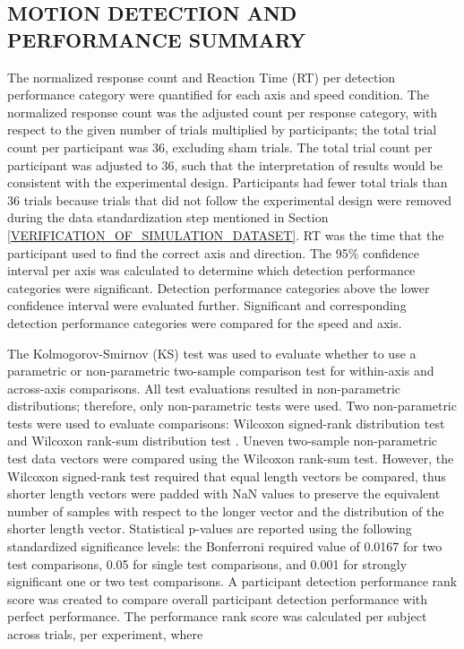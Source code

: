\documentclass{ieeeaccess}
\begin{document}
\subsection{MOTION DETECTION AND PERFORMANCE SUMMARY}
\label{MOTION_DETECTION_AND_PERFORMANCE_SUMMARY}
The normalized response count and Reaction Time (RT) per detection performance category were quantified for each axis and speed condition. The normalized response count was the adjusted count per response category, with respect to the given number of trials multiplied by participants; the total trial count per participant was 36, excluding sham trials. The total trial count per participant was adjusted to 36, such that the interpretation of results would be consistent with the experimental design. Participants had fewer total trials than 36 trials because trials that did not follow the experimental design were removed during the data standardization step mentioned in Section \ref{VERIFICATION_OF_SIMULATION_DATASET}. RT was the time that the participant used to find the correct axis and direction. The 95\% confidence interval per axis was calculated to determine which detection performance categories were significant. Detection performance categories above the lower confidence interval were evaluated further. Significant and corresponding detection performance categories were compared for the speed and axis.

\indent The Kolmogorov-Smirnov (KS) test was used to evaluate whether to use a parametric or non-parametric two-sample comparison test for within-axis and across-axis comparisons. All test evaluations resulted in non-parametric distributions; therefore, only non-parametric tests were used. Two non-parametric tests were used to evaluate comparisons: Wilcoxon signed-rank distribution test and Wilcoxon rank-sum distribution test \cite{Foundation_2013_python}. Uneven two-sample non-parametric test data vectors were compared using the Wilcoxon rank-sum test. However, the Wilcoxon signed-rank test required that equal length vectors be compared, thus shorter length vectors were padded with NaN values to preserve the equivalent number of samples with respect to the longer vector and the distribution of the shorter length vector. Statistical p-values are reported using the following standardized significance levels: the Bonferroni required value of 0.0167 for two test comparisons, 0.05 for single test comparisons, and 0.001 for strongly significant one or two test comparisons. A participant detection performance rank score was created to compare overall participant detection performance with perfect performance. The performance rank score was calculated per subject across trials, per experiment, where
\end{document}
